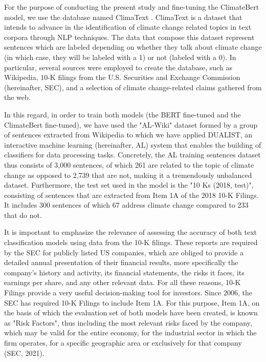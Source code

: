 \documentclass[runningheads]{llncs}
\begin{document}
For the purpose of conducting the present study and fine-tuning the ClimateBert model, we use the database named ClimaText \cite{varini2020climatext}. ClimaText is a dataset that intends to advance in the identification of climate change related topics in text corpora through NLP techniques. The data that compose this dataset represent sentences which are labeled depending on whether they talk about climate change (in which case, they will be labeled with a 1) or not (labeled with a 0). In particular, several sources were employed to create the database, such as Wikipedia, 10-K filings from the U.S. Securities and Exchange Commission (hereinafter, SEC), and a selection of climate change-related claims gathered from the web. 

In this regard, in order to train both models (the BERT fine-tuned and the ClimateBert fine-tuned), we have used the "AL-Wiki" dataset formed by a group of sentences extracted from Wikipedia to which we have applied DUALIST, an interactive machine learning (hereinafter, AL) system that enables the building of classifiers for data processing tasks. Concretely, the AL training sentences dataset thus consists of 3,000 sentences, of which 261 are related to the topic of climate change as opposed to 2,739 that are not, making it a tremendously unbalanced dataset. Furthermore, the test set used in the model is the "10 Ks (2018, test)", consisting of sentences that are extracted from Item 1A of the 2018 10-K Filings. It includes 300 sentences of which 67 address climate change compared to 233 that do not.  

It is important to emphasize the relevance of assessing the accuracy of both text classification models using data from the 10-K filings. These reports are required by the SEC for publicly listed US companies, which are obliged to provide a detailed annual presentation of their financial results, more specifically the company's history and activity, its financial statements, the risks it faces, its earnings per share, and any other relevant data. For all these reasons, 10-K Filings provide a very useful decision-making tool for investors. Since 2006, the SEC has required 10-K Filings to include Item 1A. For this purpose, Item 1A, on the basis of which the evaluation set of both models have been created, is known as "Risk Factors", thus including the most relevant risks faced by the company, which may be valid for the entire economy, for the industrial sector in which the firm operates, for a specific geographic area or exclusively for that company (SEC, 2021).    
\end{document}
